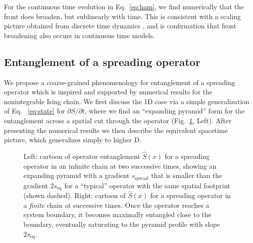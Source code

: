 \documentclass[aps,prx,twocolumn,superscriptaddress,floatfix,nofootinbib,prx]{revtex4}
\renewcommand{\>}{\right\rangle}
\newcommand{\<}{\left\langle}
\newcommand{\sspr}{s_\text{spread}}
\newcommand{\seq}{s_\text{eq}}
\begin{document}
For the continuous time evolution  in Eq.~\ref{eq:ham}, we find numerically that the front does broaden, but sublinearly with time. This is consistent with a scaling picture obtained from  discrete time dynamics \cite{nahum3,keyserlingk}, and is confirmation that front broadening also occurs in continuous time models.

\subsection{Entanglement of a spreading operator}
\label{spreadingoperatorsubsection}


We propose a coarse-grained phenomenology for entanglement of a spreading operator which is inspired and supported by numerical results for the nonintegrable Ising chain.  
We first discuss the 1D case via a simple generalization of Eq.~ \ref{eq:state} for $\partial S/\partial t$,
where we find an ``expanding pyramid'' form for the entanglement across a spatial cut through the operator (Fig.~\ref{fig:S_op_cartoon}, Left).
After presenting the numerical results we then  describe the equivalent spacetime  picture, which generalizes simply to higher D.

\begin{figure}[t]
\caption{
Left: cartoon of operator entanglement $\hat S(x)$ for a spreading operator in an infinite chain at two successive times, showing an expanding pyramid with a gradient $\sspr$ that is smaller than the gradient $2\seq$ for a ``typical'' operator with the same spatial footprint (shown dashed).
Right: cartoon of $\hat S(x)$ 
for a spreading operator in a \textit{finite} chain at successive times. Once the operator reaches a system boundary, it becomes maximally entangled close to the boundary, eventually saturating to the pyramid profile with slope $2\seq$.
} 
 \label{fig:S_op_cartoon}
\end{figure}
\end{document}
